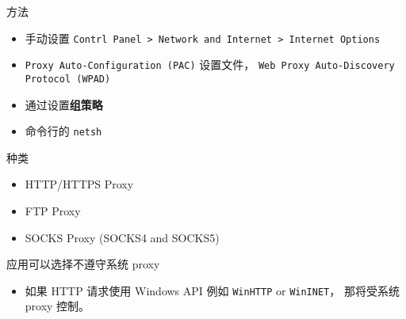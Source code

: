 
方法
\begin{itemize}
\item 手动设置 \verb`Contrl Panel > Network and Internet > Internet Options`
\item \verb`Proxy Auto-Configuration (PAC)` 设置文件， \verb`Web Proxy Auto-Discovery Protocol (WPAD)`
\item 通过设置\textbf{组策略}
\item 命令行的 \verb`netsh`
\end{itemize}

种类
\begin{itemize}
\item HTTP/HTTPS Proxy
\item FTP Proxy
\item SOCKS Proxy (SOCKS4 and SOCKS5)
\end{itemize}

应用可以选择不遵守系统 proxy
\begin{itemize}
\item 如果 HTTP 请求使用 Windows API 例如 \verb`WinHTTP` or \verb`WinINET`， 那将受系统 proxy 控制。
\end{itemize}
